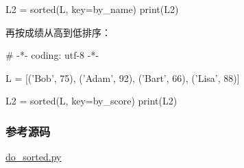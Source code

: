 \begin{pythoncode}
L2 = sorted(L, key=by_name)
print(L2)
\end{pythoncode}

再按成绩从高到低排序：

\begin{pythoncode}
# -*- coding: utf-8 -*-

L = [('Bob', 75), ('Adam', 92), ('Bart', 66), ('Lisa', 88)]
\end{pythoncode}

\begin{pythoncode}
L2 = sorted(L, key=by_score)
print(L2)
\end{pythoncode}

\hypertarget{ux53c2ux8003ux6e90ux7801}{%
\subsubsection{参考源码}\label{ux53c2ux8003ux6e90ux7801}}

\href{https://github.com/michaelliao/learn-python3/blob/master/samples/functional/do_sorted.py}{do\_sorted.py}


